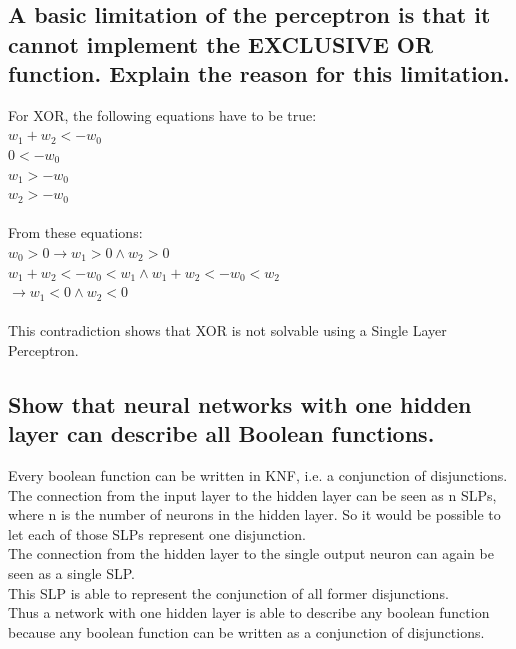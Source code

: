 \documentclass[paper=a4, fontsize=11pt]{scrartcl} %
\numberwithin{equation}{section} %
\numberwithin{figure}{section} %
\numberwithin{table}{section} %
\begin{document}
\section{}

\subsection{A basic limitation of the perceptron is that it cannot implement the EXCLUSIVE OR
function. Explain the reason for this limitation.}

For XOR, the following equations have to be true:\\
$w_1 + w_2 < -w_0$\\
$0 < -w_0$\\
$w_1 > -w_0$\\
$w_2 > -w_0$\\\\

From these equations:\\
$w_0 > 0 \rightarrow w_1 > 0 \land w_2 > 0$\\
$w_1 + w_2 < -w_0 < w_1 \land w_1 + w_2 < -w_0 < w_2$\\
$\rightarrow w_1 < 0 \land w_2 < 0$\\\\

This contradiction shows that XOR is not solvable using a Single Layer Perceptron.

\subsection{Show that neural networks with one hidden layer can describe all Boolean functions.}

Every boolean function can be written in KNF, i.e. a conjunction of disjunctions.\\
The connection from the input layer to the hidden layer can be seen as n SLPs, where n is the number of neurons in the hidden layer. So it would be possible to let each of those SLPs represent one disjunction.\\
The connection from the hidden layer to the single output neuron can again be seen as a single SLP.\\
This SLP is able to represent the conjunction of all former disjunctions.\\
Thus a network with one hidden layer is able to describe any boolean function because any boolean function can be written as a conjunction of disjunctions.
\end{document}
